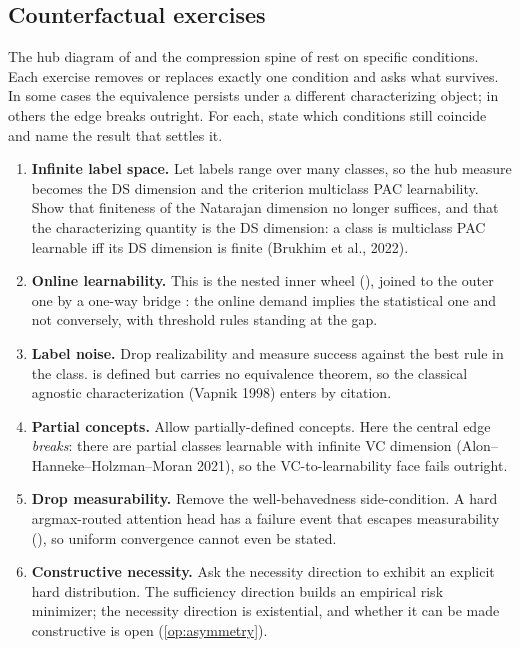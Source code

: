 \subsection*{Counterfactual exercises}

The hub diagram of  and the compression spine of  rest on specific conditions. Each exercise removes or replaces exactly one condition and asks what survives. In some cases the equivalence persists under a different characterizing object; in others the edge breaks outright. For each, state which conditions still coincide and name the result that settles it.

\begin{enumerate}[leftmargin=*,itemsep=3pt]
\item \textbf{Infinite label space.} Let labels range over many classes, so the hub measure becomes the DS dimension and the criterion multiclass PAC learnability. Show that finiteness of the Natarajan dimension no longer suffices, and that the characterizing quantity is the DS dimension: a class is multiclass PAC learnable iff its DS dimension is finite (Brukhim et al., 2022).
\item \textbf{Online learnability.} This is the nested inner wheel (), joined to the outer one by a one-way bridge : the online demand implies the statistical one and not conversely, with threshold rules standing at the gap.
\item \textbf{Label noise.} Drop realizability and measure success against the best rule in the class.  is defined but carries no equivalence theorem, so the classical agnostic characterization (Vapnik 1998) enters by citation.
\item \textbf{Partial concepts.} Allow partially-defined concepts. Here the central edge \emph{breaks}: there are partial classes learnable with infinite VC dimension (Alon--Hanneke--Holzman--Moran 2021), so the VC-to-learnability face fails outright.
\item \textbf{Drop measurability.} Remove the well-behavedness side-condition. A hard argmax-routed attention head has a failure event that escapes measurability (), so uniform convergence cannot even be stated.
\item \textbf{Constructive necessity.} Ask the necessity direction to exhibit an explicit hard distribution. The sufficiency direction builds an empirical risk minimizer; the necessity direction is existential, and whether it can be made constructive is open (\cref{op:asymmetry}).

\end{enumerate}
